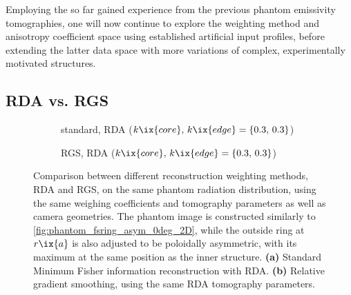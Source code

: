                 Employing the so far gained experience from the previous phantom emissivity tomographies, one will now continue to explore the weighting method and anisotropy coefficient space using established artificial input profiles, before extending the latter data space with more variations of complex, experimentally motivated structures.%
%
            \subsection*{RDA vs. RGS}%
%
                \begin{figure}[t]%
                    \centering%
                    \begin{subfigure}{\textwidth}%
                        \centering%
                        \caption{standard, RDA ($k\ix{core},\,k\ix{edge}=\left\{0.3,\,0.3\right\}$)}%
                    \end{subfigure}%
                    \newline%
                    \begin{subfigure}{\textwidth}%
                        \centering%
                        \caption{RGS, RDA ($k\ix{core},\,k\ix{edge}=\left\{0.3,\,0.3\right\}$)}%
                    \end{subfigure}%
                    \caption{Comparison between different reconstruction weighting methods, RDA and RGS, on the same phantom radiation distribution, using the same weighing coefficients and tomography parameters as well as camera geometries. The phantom image is constructed similarly to \cref{fig:phantom_fsring_asym_0deg_2D}, while the outside ring at $r\ix{a}$ is also adjusted to be poloidally asymmetric, with its maximum at the same position as the inner structure. \textbf{(a)} Standard Minimum Fisher information reconstruction with RDA. \textbf{(b)} Relative gradient smoothing, using the same RDA tomography parameters.}\label{fig:phantom_fsring_asym_comparison_RGS}%
                \end{figure}%
